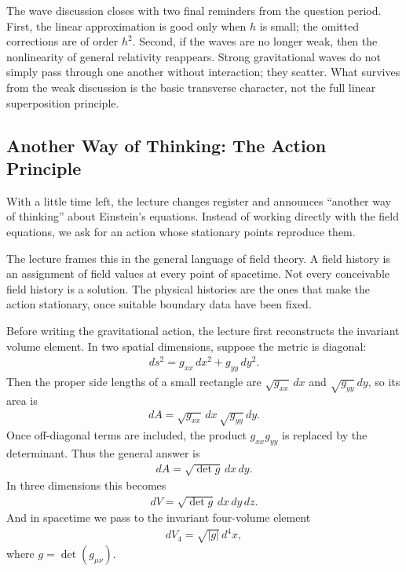 The wave discussion closes with two final reminders from the question period. First, the linear approximation is good only when \(h\) is small; the omitted corrections are of order \(h^2\). Second, if the waves are no longer weak, then the nonlinearity of general relativity reappears. Strong gravitational waves do not simply pass through one another without interaction; they scatter. What survives from the weak discussion is the basic transverse character, not the full linear superposition principle.

\subsection{Another Way of Thinking: The Action Principle}

With a little time left, the lecture changes register and announces ``another way of thinking'' about Einstein's equations. Instead of working directly with the field equations, we ask for an action whose stationary points reproduce them.

The lecture frames this in the general language of field theory. A field history is an assignment of field values at every point of spacetime. Not every conceivable field history is a solution. The physical histories are the ones that make the action stationary, once suitable boundary data have been fixed.

Before writing the gravitational action, the lecture first reconstructs the invariant volume element. In two spatial dimensions, suppose the metric is diagonal:
\begin{align}
ds^{2}=g_{xx}\,dx^{2}+g_{yy}\,dy^{2}.
\end{align}
Then the proper side lengths of a small rectangle are \(\sqrt{g_{xx}}\,dx\) and \(\sqrt{g_{yy}}\,dy\), so its area is
\begin{align}
dA=\sqrt{g_{xx}}\,dx\,\sqrt{g_{yy}}\,dy.
\end{align}
Once off-diagonal terms are included, the product \(g_{xx}g_{yy}\) is replaced by the determinant. Thus the general answer is
\begin{align}
dA=\sqrt{\det g}\,dx\,dy.
\end{align}
In three dimensions this becomes
\begin{align}
dV=\sqrt{\det g}\,dx\,dy\,dz.
\end{align}
And in spacetime we pass to the invariant four-volume element
\begin{align}
dV_{4}=\sqrt{|g|}\,d^{4}x,
\end{align}
where \(g=\det(g_{\mu\nu})\).

